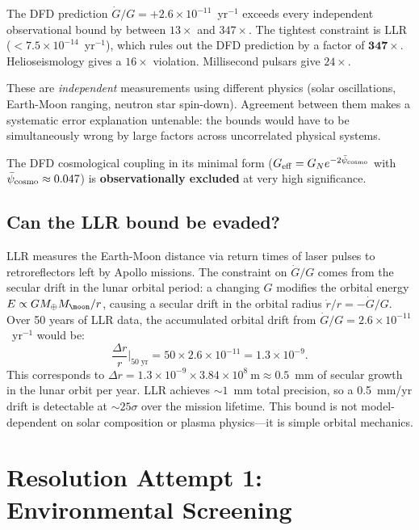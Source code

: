 \documentclass[11pt]{article}
\newcommand{\ee}[1]{\times 10^{#1}}
\newcommand{\psicosmo}{\bar{\psi}_{\rm cosmo}}
\begin{document}
\begin{tcolorbox}[colback=red!5!white, colframe=red!60!black,
  title=\textbf{Critical Finding: DFD is Incompatible with ALL Tight Bounds}]
The DFD prediction $\dot{G}/G = +2.6\ee{-11}$~yr$^{-1}$ exceeds every
independent observational bound by between $13\times$ and $347\times$.
The tightest constraint is LLR ($< 7.5\ee{-14}$~yr$^{-1}$), which
rules out the DFD prediction by a factor of $\mathbf{347\times}$.
Helioseismology gives a $16\times$ violation. Millisecond pulsars give
$24\times$.

These are \emph{independent} measurements using different physics (solar
oscillations, Earth-Moon ranging, neutron star spin-down). Agreement
between them makes a systematic error explanation untenable: the bounds
would have to be simultaneously wrong by large factors across uncorrelated
physical systems.

The DFD cosmological coupling in its minimal form ($G_{\rm eff} = G_N
e^{-2\psicosmo}$ with $\psicosmo \approx 0.047$) is \textbf{observationally
excluded} at very high significance.
\end{tcolorbox}

\subsection{Can the LLR bound be evaded?}

LLR measures the Earth-Moon distance via return times of laser pulses to
retroreflectors left by Apollo missions. The constraint on $\dot{G}/G$ comes from
the secular drift in the lunar orbital period: a changing $G$ modifies the orbital
energy $E \propto G M_\oplus M_\moon / r$, causing a secular drift in the orbital
radius $\dot{r}/r = -\dot{G}/G$. Over 50 years of LLR data, the accumulated
orbital drift from $\dot{G}/G = 2.6\ee{-11}$~yr$^{-1}$ would be:
\begin{equation}
\frac{\Delta r}{r}\bigg|_{50\;\text{yr}} = 50 \times 2.6\ee{-11} = 1.3\ee{-9}.
\end{equation}
This corresponds to $\Delta r = 1.3\ee{-9} \times 3.84\ee{8}~\text{m} \approx 0.5$~mm
of secular growth in the lunar orbit per year. LLR achieves $\sim 1$~mm total
precision, so a 0.5~mm/yr drift is detectable at $\sim 25\sigma$ over the
mission lifetime. This bound is not model-dependent on solar composition or
plasma physics---it is simple orbital mechanics.

\section{Resolution Attempt 1: Environmental Screening}
\label{sec:screening}
\end{document}
